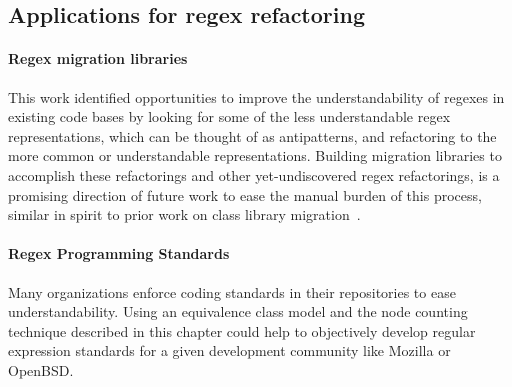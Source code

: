 \subsection{Applications for regex refactoring}

\paragraph{Regex migration libraries}
This work identified opportunities to improve the understandability of regexes in existing code bases by looking for some of the less understandable regex representations, which can be thought of as antipatterns, and refactoring to the more common or understandable representations.  Building migration libraries to accomplish these refactorings and other yet-undiscovered regex refactorings, is a promising direction of future work to ease the manual burden of this process, similar in spirit to prior work on class library migration~\cite{Balaban:2005:RSC:1103845.1094832}.

\paragraph{Regex Programming Standards}
Many organizations enforce coding standards in their repositories to ease understandability.  Using an equivalence class model and the node counting technique described in this chapter could help to objectively develop regular expression standards for a given development community like Mozilla or OpenBSD.
